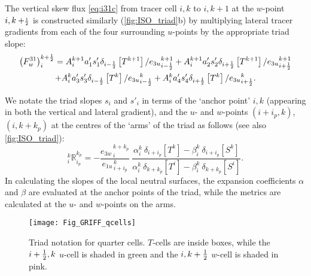 \documentclass[../tex_main/NEMO_manual]{subfiles}
\begin{document}
The vertical skew flux \autoref{eq:i31c} from tracer cell $i,k$ to $i,k+1$ at
the $w$-point $i,k+\scriptstyle\frac{1}{2}$ is constructed similarly (\autoref{fig:ISO_triad}b) by
multiplying lateral tracer gradients from each of the four surrounding $u$-points by the appropriate triad slope:
\begin{multline}
  \label{eq:i31}
  \left( F_w^{31} \right) _i ^{k+\frac{1}{2}} =  {A}_i^{k+1} a_{1}'
  s_{1}' \delta _{i-\frac{1}{2}} \left[ T^{k+1} \right]/{e_{3u}}_{i-\frac{1}{2}}^{k+1}
   +{A}_i^{k+1} a_{2}' s_{2}' \delta _{i+\frac{1}{2}} \left[ T^{k+1} \right]/{e_{3u}}_{i+\frac{1}{2}}^{k+1}\\
  + {A}_i^k a_{3}' s_{3}' \delta _{i-\frac{1}{2}} \left[ T^k\right]/{e_{3u}}_{i-\frac{1}{2}}^k
  +{A}_i^k a_{4}' s_{4}' \delta _{i+\frac{1}{2}} \left[ T^k \right]/{e_{3u}}_{i+\frac{1}{2}}^k.
\end{multline}

We notate the triad slopes $s_i$ and $s'_i$ in terms of the `anchor point' $i,k$
(appearing in both the vertical and lateral gradient),
and the $u$- and $w$-points $(i+i_p,k)$, $(i,k+k_p)$ at the centres of the `arms' of the triad as follows
(see also \autoref{fig:ISO_triad}):
\begin{equation}
  \label{eq:R}
  _i^k \mathbb{R}_{i_p}^{k_p}
  =-\frac{ {e_{3w}}_{\,i}^{\,k+k_p}} { {e_{1u}}_{\,i+i_p}^{\,k}}
  \
  \frac
  { \alpha_i^k  \ \delta_{i+i_p}[T^k] - \beta_i^k \ \delta_{i+i_p}[S^k] }
  { \alpha_i^k  \ \delta_{k+k_p}[T^i] - \beta_i^k \ \delta_{k+k_p}[S^i] }.
\end{equation}
In calculating the slopes of the local neutral surfaces,
the expansion coefficients $\alpha$ and $\beta$ are evaluated at the anchor points of the triad,
while the metrics are calculated at the $u$- and $w$-points on the arms.

\begin{figure}[tb] \begin{center}
    \texttt{[image: Fig\_GRIFF\_qcells]}
    \caption{   \protect\label{fig:qcells}
      Triad notation for quarter cells. $T$-cells are inside boxes,
      while the  $i+\textstyle\frac{1}{2},k$ $u$-cell is shaded in green and
      the $i,k+\textstyle\frac{1}{2}$ $w$-cell is shaded in pink.}
  \end{center} \end{figure}
\end{document}
